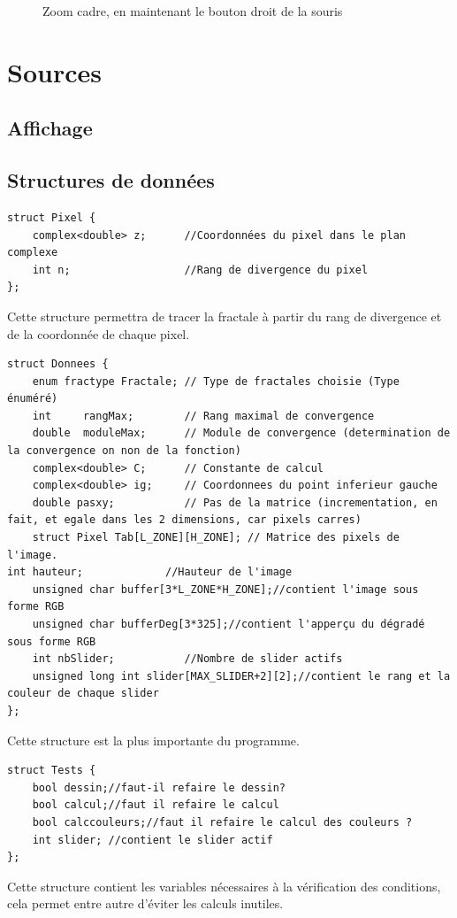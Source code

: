 \documentclass[a4paper,11pt]{article} \usepackage[T1]{fontenc} \usepackage[utf8]{inputenc} \usepackage[francais]{babel}
\begin{document}
\begin{itemize}
\begin{figure}[H]
\begin{center}
            \caption{Zoom cadre, en maintenant le bouton droit de la souris}
        \end{center} \end{figure}

\end{itemize}



\section{Sources}

\subsection{Affichage}%

\subsection{Structures de données}
\begin{lstlisting}
struct Pixel {
    complex<double> z;      //Coordonnées du pixel dans le plan complexe
    int n;                  //Rang de divergence du pixel
};
\end{lstlisting}
Cette structure permettra de tracer la fractale à partir du rang de divergence et de la coordonnée de chaque pixel.
\begin{lstlisting}
struct Donnees {
    enum fractype Fractale; // Type de fractales choisie (Type énuméré)
    int     rangMax;        // Rang maximal de convergence
    double  moduleMax;      // Module de convergence (determination de la convergence on non de la fonction)
    complex<double> C;      // Constante de calcul
    complex<double> ig;     // Coordonnees du point inferieur gauche
    double pasxy;           // Pas de la matrice (incrementation, en fait, et egale dans les 2 dimensions, car pixels carres)
    struct Pixel Tab[L_ZONE][H_ZONE]; // Matrice des pixels de l'image.
int hauteur;             //Hauteur de l'image
    unsigned char buffer[3*L_ZONE*H_ZONE];//contient l'image sous forme RGB
    unsigned char bufferDeg[3*325];//contient l'apperçu du dégradé sous forme RGB
    int nbSlider;           //Nombre de slider actifs
    unsigned long int slider[MAX_SLIDER+2][2];//contient le rang et la couleur de chaque slider
};

\end{lstlisting}
Cette structure est la plus importante du programme.

\begin{lstlisting}
struct Tests {
    bool dessin;//faut-il refaire le dessin?
    bool calcul;//faut il refaire le calcul
    bool calccouleurs;//faut il refaire le calcul des couleurs ?
    int slider; //contient le slider actif
};\end{lstlisting}
Cette structure contient les variables nécessaires à la vérification des conditions, cela permet entre autre d’éviter les calculs inutiles.
\end{document}
